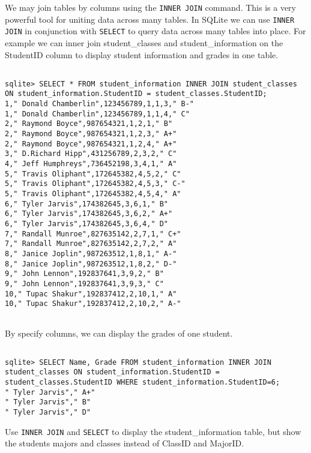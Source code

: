 We may join tables by columns using the {\tt INNER JOIN} command.  This is a very powerful tool for uniting data across many tables.  In SQLite we can use {\tt INNER JOIN} in conjunction with {\tt SELECT} to query data across many tables into place.  For example we can inner join student\_classes and student\_information on the StudentID column to display student information and grades in one table.

\begin{lstlisting}

sqlite> SELECT * FROM student_information INNER JOIN student_classes ON student_information.StudentID = student_classes.StudentID;
1," Donald Chamberlin",123456789,1,1,3," B-"
1," Donald Chamberlin",123456789,1,1,4," C"
2," Raymond Boyce",987654321,1,2,1," B"
2," Raymond Boyce",987654321,1,2,3," A+"
2," Raymond Boyce",987654321,1,2,4," A+"
3," D.Richard Hipp",431256789,2,3,2," C"
4," Jeff Humphreys",736452198,3,4,1," A"
5," Travis Oliphant",172645382,4,5,2," C"
5," Travis Oliphant",172645382,4,5,3," C-"
5," Travis Oliphant",172645382,4,5,4," A"
6," Tyler Jarvis",174382645,3,6,1," B"
6," Tyler Jarvis",174382645,3,6,2," A+"
6," Tyler Jarvis",174382645,3,6,4," D"
7," Randall Munroe",827635142,2,7,1," C+"
7," Randall Munroe",827635142,2,7,2," A"
8," Janice Joplin",987263512,1,8,1," A-"
8," Janice Joplin",987263512,1,8,2," D-"
9," John Lennon",192837641,3,9,2," B"
9," John Lennon",192837641,3,9,3," C"
10," Tupac Shakur",192837412,2,10,1," A"
10," Tupac Shakur",192837412,2,10,2," A-"


\end{lstlisting}

By specify columns, we can display the grades of one student.

\begin{lstlisting}

sqlite> SELECT Name, Grade FROM student_information INNER JOIN student_classes ON student_information.StudentID = student_classes.StudentID WHERE student_information.StudentID=6;
" Tyler Jarvis"," A+"
" Tyler Jarvis"," B"
" Tyler Jarvis"," D"

\end{lstlisting}

\begin{problem}

Use {\tt INNER JOIN} and {\tt SELECT} to display the student\_information table, but show the students majors and classes instead of ClassID and MajorID.

\end{problem}

